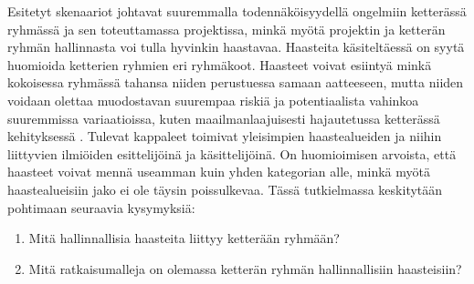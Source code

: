 Esitetyt skenaariot johtavat suuremmalla todennäköisyydellä ongelmiin ketterässä ryhmässä ja sen toteuttamassa projektissa, minkä myötä projektin ja ketterän ryhmän hallinnasta voi tulla hyvinkin haastavaa. Haasteita käsiteltäessä on syytä huomioida ketterien ryhmien eri ryhmäkoot. Haasteet voivat esiintyä minkä kokoisessa ryhmässä tahansa niiden perustuessa samaan aatteeseen, mutta niiden voidaan olettaa muodostavan suurempaa riskiä ja potentiaalista vahinkoa suuremmissa variaatioissa, kuten maailmanlaajuisesti hajautetussa ketterässä kehityksessä \cite{ALZOUBI201622}. Tulevat kappaleet toimivat yleisimpien haastealueiden ja niihin liittyvien ilmiöiden esittelijöinä ja käsittelijöinä. On huomioimisen arvoista, että haasteet voivat mennä useamman kuin yhden kategorian alle, minkä myötä haastealueisiin jako ei ole täysin poissulkevaa. Tässä tutkielmassa keskitytään pohtimaan seuraavia kysymyksiä: \begin{enumerate}
    \item Mitä hallinnallisia haasteita liittyy ketterään ryhmään?
    \item Mitä ratkaisumalleja on olemassa ketterän ryhmän hallinnallisiin haasteisiin?
\end{enumerate}
